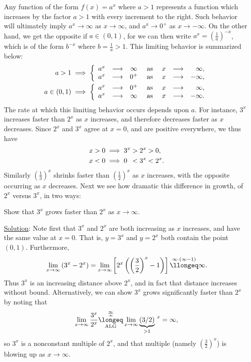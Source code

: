 Any function of the form
$f(x)=a^x$ where $a>1$ represents a function which increases
by the factor $a>1$ with every increment to the right.
Such behavior will ultimately imply $a^x\longrightarrow\infty$ as
$x\longrightarrow\infty$, and $a^x\longrightarrow0^+$ as 
$x\longrightarrow-\infty$.
On the other hand, we get the opposite if $a\in(0,1)$, for
we can then write $a^x=\left(\frac1a\right)^{-x}$,
which is of the form $b^{-x}$ where $b=\frac1a>1$.  This
limiting behavior is summarized below:
\begin{align*}
a>1&\implies\left\{\begin{array}{ccccccc}a^x&\longrightarrow&\infty
                     &\text{ as }&x&\longrightarrow&\hphantom{-}\infty,\\
                     a^x&\longrightarrow&0^+
                     &\text{ as }&x&\longrightarrow
                          &-\infty,\end{array}\right.\\
a\in(0,1)&\implies\left\{\begin{array}{ccccccc}a^x&\longrightarrow&0^+
                     &\text{ as }&x&\longrightarrow&\hphantom{-}\infty,\\
                     a^x&\longrightarrow&\infty
                     &\text{ as }&x&\longrightarrow&-\infty.\end{array}\right.
\end{align*}
The rate at which this limiting behavior occurs depends upon
$a$.  For instance, $3^x$ increases faster than $2^x$ as $x$ increases,
and therefore decreases faster as $x$ decreases.  Since
$2^x$ and $3^x$ agree at $x=0$, and are positive everywhere, we thus have
\begin{align*}
 x>0&\implies 3^x>2^x>0,\\ x<0&\implies0\hphantom{{}^x}< 3^x<2^x.\end{align*}
Similarly $\left(\frac13\right)^x$ shrinks faster than 
$\left(\frac12\right)^x$ as $x$ increases, with the opposite
occurring as $x$ decreases.  Next we see how dramatic this difference
in growth, of $2^x$ versus $3^x$, in two ways:

\bex Show that $3^x$ grows faster than $2^x$ as $x\longrightarrow\infty$.

\underline{Solution}: Note first that $3^x$ and $2^x$ are both
increasing as $x$ increases, and have the same value at $x=0$.  That is,
$y=3^x$ and $y=2^x$ both contain the point $(0,1)$.
Furthermore,
$$\lim_{x\to\infty}\left(3^x-2^x\right)
  =\lim_{x\to\infty}\left[2^x\left(\left(\frac32\right)^x-1\right)\right]
         \overset{\infty\cdot(\infty-1)}{\llongeq}\infty.$$
Thus $3^x$ is an increasing distance above
$2^x$, and in fact that distance increases without bound.
Alternatively,
we can  show $3^x$ grows significantly faster
than $2^x$ by noting that 
$$\lim_{x\to\infty}\frac{3^x}{2^x}\underset{\text{ALG}}{
 \overset{\frac{\infty}{\infty}}{\longeq}}
      \lim_{x\to\infty}{\underbrace{\left(3/2\right)}_{>1}}^{\ x}=\infty,$$
so $3^x$ is a nonconstant multiple of $2^x$, and that multiple
(namely $\left(\frac32\right)^x$) is blowing up as $x\to\infty$.
\eex





